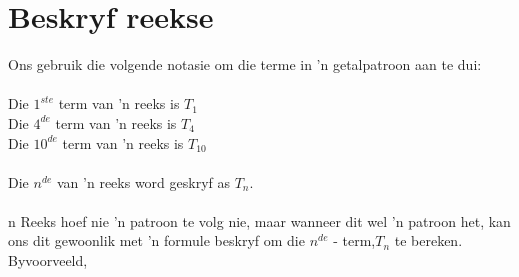 \section{Beskryf reekse}

 
Ons gebruik die volgende notasie om die terme in 'n getalpatroon aan te dui:\\
\\
Die $1^{ste}$ term van 'n reeks is $T_{1}$\\
Die $4^{de}$  term van 'n reeks is $T_{4}$\\
Die $10^{de}$  term van 'n reeks is $T_{10}$\\
\\
Die  ${n}^{de}$  van ’n reeks word geskryf as ${T}_{n}$. \\
\\n Reeks hoef nie ’n patroon te volg nie, maar wanneer dit wel ’n patroon het, kan ons
dit gewoonlik met ’n formule beskryf om die ${n}^{de}$ - term,${T}_{n}$ te bereken. 
Byvoorveeld,
     
